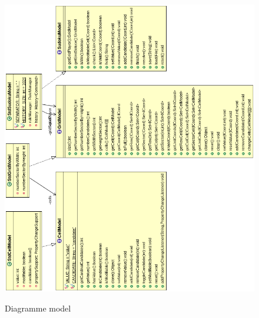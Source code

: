 \begin{figure}[ht]
  \caption{\label{annexe7} Diagramme model}
  \includegraphics [width=160mm]{images/model.png} \\[0.5cm]
\end{figure}

